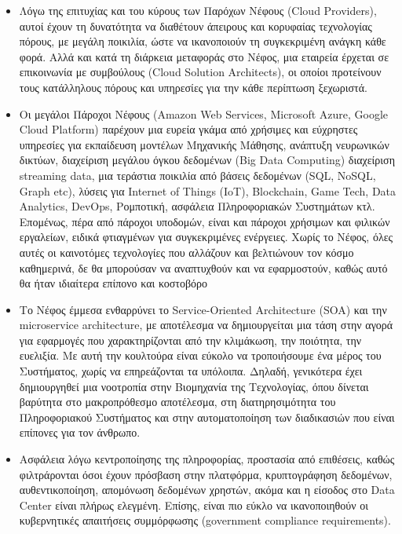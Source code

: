 \documentclass{article}
\begin{document}
\begin{itemize}
\item	Λόγω της επιτυχίας και του κύρους των Παρόχων Νέφους (Cloud Providers), αυτοί έχουν τη δυνατότητα να διαθέτουν άπειρους και κορυφαίας τεχνολογίας πόρους, με μεγάλη ποικιλία, ώστε να ικανοποιούν τη συγκεκριμένη ανάγκη κάθε φορά. Αλλά και κατά τη διάρκεια μεταφοράς στο Νέφος, μια εταιρεία έρχεται σε επικοινωνία με συμβούλους (Cloud Solution Architects), οι οποίοι προτείνουν τους κατάλληλους πόρους και υπηρεσίες για την κάθε περίπτωση ξεχωριστά.

\item	Οι μεγάλοι Πάροχοι Νέφους (Amazon Web Services, Microsoft Azure, Google Cloud Platform) παρέχουν μια ευρεία γκάμα από χρήσιμες και εύχρηστες υπηρεσίες για εκπαίδευση μοντέλων Μηχανικής Μάθησης, ανάπτυξη νευρωνικών δικτύων, διαχείριση μεγάλου όγκου δεδομένων (Big Data Computing) διαχείριση streaming data, μια τεράστια ποικιλία από βάσεις δεδομένων (SQL, NoSQL, Graph etc), λύσεις για Internet of Things (IoT), Blockchain, Game Tech, Data Analytics, DevOps, Ρομποτική, ασφάλεια Πληροφοριακών Συστημάτων κτλ. Επομένως, πέρα από πάροχοι υποδομών, είναι και πάροχοι χρήσιμων και φιλικών εργαλείων, ειδικά φτιαγμένων για συγκεκριμένες ενέργειες. Χωρίς το Νέφος, όλες αυτές οι καινοτόμες τεχνολογίες που αλλάζουν και βελτιώνουν τον κόσμο καθημερινά, δε θα μπορούσαν να αναπτυχθούν και να εφαρμοστούν, καθώς αυτό θα ήταν ιδιαίτερα επίπονο και κοστοβόρο

\item	Το Νέφος έμμεσα ενθαρρύνει το Service-Oriented Architecture (SOA) και την microservice architecture, με αποτέλεσμα να δημιουργείται μια τάση στην αγορά για εφαρμογές που χαρακτηρίζονται από την κλιμάκωση, την ποιότητα, την ευελιξία. Με αυτή την κουλτούρα είναι εύκολο να τροποιήσουμε ένα μέρος του Συστήματος, χωρίς να επηρεάζονται τα υπόλοιπα. Δηλαδή, γενικότερα έχει δημιουργηθεί μια νοοτροπία στην Βιομηχανία της Τεχνολογίας, όπου δίνεται βαρύτητα στο μακροπρόθεσμο αποτέλεσμα, στη διατηρησιμότητα του Πληροφοριακού Συστήματος και στην αυτοματοποίηση των διαδικασιών που είναι επίπονες για τον άνθρωπο.

\item	Ασφάλεια λόγω κεντροποίησης της πληροφορίας, προστασία από επιθέσεις, καθώς φιλτράρονται όσοι έχουν πρόσβαση στην πλατφόρμα, κρυπτογράφηση δεδομένων, αυθεντικοποίηση, απομόνωση δεδομένων χρηστών, ακόμα και η είσοδος στο Data Center είναι πλήρως ελεγμένη. Επίσης, είναι πιο εύκλο να ικανοποιηθούν οι κυβερνητικές απαιτήσεις συμμόρφωσης (government compliance requirements).


\end{itemize}
\end{document}
